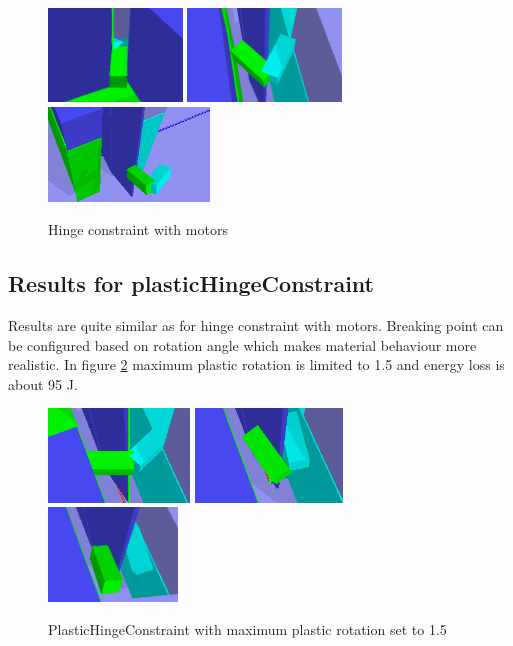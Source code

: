 \begin{figure}[htb!]
\centering
\includegraphics[height=2.5cm]{figs/f5-18-01-1}
\includegraphics[height=2.5cm]{figs/f5-18-01-2}
\includegraphics[height=2.5cm]{figs/f5-18-01-3}
\caption{Hinge constraint with motors}
\label{fig:f5-results}
\end{figure}


\subsection{Results for plasticHingeConstraint}
Results are quite similar as for hinge constraint with motors. 
Breaking point can be configured based on rotation angle which makes material behaviour more realistic.
In figure \ref{fig:f6-results} maximum plastic rotation is limited to 1.5 and energy loss is about 95 J.

\begin{figure}[htb!]
\centering
\includegraphics[height=2.5cm]{figs/f6-18-01-1}
\includegraphics[height=2.5cm]{figs/f6-18-01-2}
\includegraphics[height=2.5cm]{figs/f6-18-01-3}
\caption{PlasticHingeConstraint with maximum plastic rotation set to 1.5}
\label{fig:f6-results}
\end{figure}


